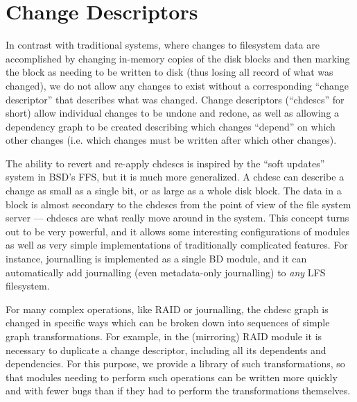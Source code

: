 \section{Change Descriptors}
\label{sec:chdescs}

In contrast with traditional systems, where changes to filesystem data are
accomplished by changing in-memory copies of the disk blocks and then marking
the block as needing to be written to disk (thus losing all record of what was
changed), we do not allow any changes to exist without a corresponding ``change
descriptor'' that describes what was changed. Change descriptors (``chdescs''
for short) allow individual changes to be undone and redone, as well as allowing
a dependency graph to be created describing which changes ``depend'' on which
other changes (i.e. which changes must be written after which other changes).

The ability to revert and re-apply chdescs is inspired by the ``soft updates''
system in BSD's FFS, but it is much more generalized. A chdesc can describe a
change as small as a single bit, or as large as a whole disk block. The data in
a block is almost secondary to the chdescs from the point of view of the file
system server --- chdescs are what really move around in the system. This concept
turns out to be very powerful, and it allows some interesting configurations of
modules as well as very simple implementations of traditionally complicated
features. For instance, journalling is implemented as a single BD module, and it
can automatically add journalling (even metadata-only journalling) to {\it any}
LFS filesystem.

For many complex operations, like RAID or journalling, the chdesc graph is
changed in specific ways which can be broken down into sequences of simple graph
transformations. For example, in the (mirroring) RAID module it is necessary to
duplicate a change descriptor, including all its dependents and dependencies.
For this purpose, we provide a library of such transformations, so that modules
needing to perform such operations can be written more quickly and with fewer
bugs than if they had to perform the transformations themselves.
